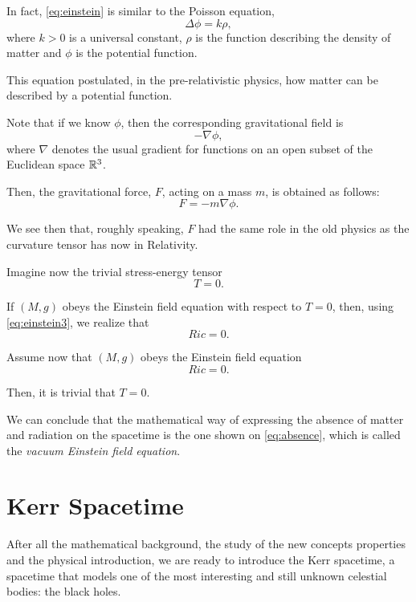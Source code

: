 In fact, \autoref{eq:einstein} is similar to the Poisson equation,
\[
\Delta\phi = k\rho,
\]
where $k>0$ is a universal constant, $\rho$ is the function describing the density of matter and $\phi$ is the potential function.

This equation postulated, in the pre-relativistic physics, how matter can be described by a potential function.

Note that if we know $\phi$, then the corresponding gravitational field is 
\[
-\nabla \phi,
\]
where $\nabla$ denotes the usual gradient for functions on an open subset of the Euclidean space $\mathbb{R}^3$.

Then, the gravitational force, $F$, acting on a mass $m$, is obtained as follows:
\[
F = -m\nabla\phi.
\]

We see then that, roughly speaking, $F$ had the same role in the old physics as the curvature tensor has now in Relativity.

Imagine now the trivial stress-energy tensor
\[
T = 0.
\]

If $(M,g)$ obeys the Einstein field equation with respect to $T = 0$, then, using \autoref{eq:einstein3}, we realize that
\[
Ric = 0.
\]

Assume now that $(M,g)$ obeys the Einstein field equation
\begin{equation}
\label{eq:absence}
Ric = 0.
\end{equation}

Then, it is trivial that $T=0$.

We can conclude that the mathematical way of expressing the absence of matter and radiation on the spacetime is the one shown on \autoref{eq:absence}, which is called the \emph{vacuum Einstein field equation}.



















\section{Kerr Spacetime}
\label{chapter:kerr}

After all the mathematical background, the study of the new concepts properties and the physical introduction, we are ready to introduce the Kerr spacetime, a spacetime that models one of the most interesting and still unknown celestial bodies: the black holes.

